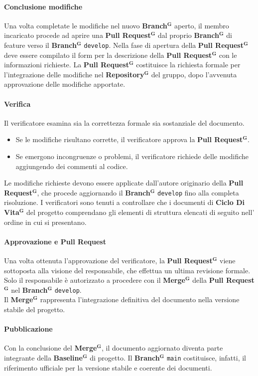 \documentclass[a4paper,12pt]{article}
\newcommand{\term}[1]{\textbf{#1}$^\mathbf{G}$}
\newcommand{\ignoreglossary}{}
\begin{document}
\paragraph{Conclusione modifiche} 
Una volta completate le modifiche nel nuovo \term{Branch} aperto, il membro incaricato procede ad aprire una \term{Pull Request} dal proprio \term{Branch} di feature verso il \term{Branch} \texttt{develop}. 
Nella fase di apertura della \term{Pull Request} deve essere compilato il form per la descrizione della \term{Pull Request} con le informazioni richieste. La \term{Pull Request} costituisce la richiesta formale per l'integrazione delle modifiche nel \term{Repository} del gruppo, dopo l'avvenuta approvazione delle modifiche apportate.

\paragraph{\ignoreglossary{Verifica}} Il verificatore esamina sia la correttezza formale sia sostanziale del documento.
    \begin{itemize}
        \item Se le modifiche risultano corrette, il verificatore approva la \term{Pull Request}.
        \item Se emergono incongruenze o problemi, il verificatore richiede delle modifiche aggiungendo dei commenti al codice.
    \end{itemize}
Le modifiche richieste devono essere applicate dall’autore originario della \term{Pull Request}, che procede aggiornando il \term{Branch} \texttt{develop} fino alla completa risoluzione.
I verificatori sono tenuti a controllare che i documenti di \term{Ciclo Di Vita} del progetto comprendano gli elementi di struttura elencati di seguito nell' ordine in cui si presentano.

\paragraph{Approvazione e \ignoreglossary{Pull Request}} Una volta ottenuta l’approvazione del verificatore, la \term{Pull Request} viene sottoposta alla visione del responsabile, che effettua un ultima revisione formale. Solo il responsabile è autorizzato a procedere con il \term{Merge} della \term{Pull Request} nel \term{Branch} \texttt{develop}.
\\Il \term{Merge} rappresenta l’integrazione definitiva del documento nella versione stabile del progetto.

\paragraph{Pubblicazione} Con la conclusione del \term{Merge}, il documento aggiornato diventa parte integrante della \term{Baseline} di progetto. Il \term{Branch} \texttt{main} costituisce, infatti, il riferimento ufficiale per la versione stabile e coerente dei documenti.
\end{document}
